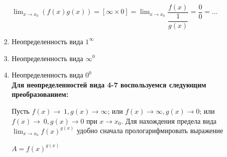 \documentclass[oneside]{book}
\begin{document}
\begin{enumerate}
\begin{itemize}
\begin{enumerate}
	$\lim_{x \to x_{0}} (f(x)g(x))=
	[\infty\times 0]=
	\lim_{x \to x_{0}} \dfrac{f(x)}{\dfrac{1}{g(x)}}=
	\dfrac{0}{0}=...$

	\item Неопределенность вида $1^{\infty}$
	\item Неопределенность вида $\infty^{0}$
	\item Неопределенность вида $0^{0}$\\

	\textbf{Для неопределенностей вида 4-7 воспользуемся следующим преобразованием:}

	Пусть $f(x)\to\ 1, g(x)\to\infty$; или $f(x)\to\infty, g(x)\to 0$; или $f(x)\to\ 0, g(x)\to 0$ при $x\to x_{0}$. Для нахождения предела вида $\lim_{x\to x_{0}} f(x)^{g(x)}$ удобно сначала прологарифмировать выражение
	 \begin{center}
		$A=f(x)^{g(x)}$
	\end{center}

  \setcounter{chapter}{25}         

\end{enumerate}
\end{itemize}
\end{enumerate}
\end{document}
